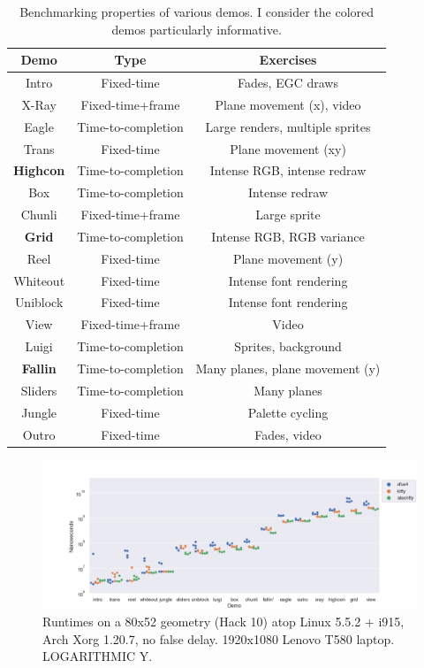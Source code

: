 \begin{table}[!htbp]
  \centering
  \begin{tabular}{ |c|c|c| }
    \hline
    Demo & Type & Exercises \\
    \hline
    \hline
    Intro & Fixed-time & Fades, EGC draws \\
    \hline
    X-Ray & Fixed-time+frame & Plane movement (x), video \\
    \hline
    Eagle & Time-to-completion & Large renders, multiple sprites \\
    \hline
    Trans & Fixed-time & Plane movement (xy) \\
    \hline
    \rowcolor{blue!25}
    \textbf{Highcon} & Time-to-completion & Intense RGB, intense redraw \\
    \hline
    Box & Time-to-completion & Intense redraw \\
    \hline
    Chunli & Fixed-time+frame & Large sprite \\
    \hline
    \rowcolor{blue!25}
    \textbf{Grid} & Time-to-completion & Intense RGB, RGB variance \\
    \hline
    Reel & Fixed-time & Plane movement (y) \\
    \hline
    Whiteout & Fixed-time & Intense font rendering \\
    \hline
    Uniblock & Fixed-time & Intense font rendering \\
    \hline
    View & Fixed-time+frame & Video \\
    \hline
    Luigi & Time-to-completion & Sprites, background \\
    \hline
    \rowcolor{blue!25}
    \textbf{Fallin} & Time-to-completion & Many planes, plane movement (y) \\
    \hline
    Sliders & Time-to-completion & Many planes \\
    \hline
    Jungle & Fixed-time & Palette cycling \\
    \hline
    Outro & Fixed-time & Fades, video \\
    \hline
  \end{tabular}
\caption[Benchmarking properties of various demos.]{Benchmarking properties of
  various demos. I consider the colored demos particularly informative.}
\label{table:benchmarks}
\end{table}


\begin{figure}
\centering
\includegraphics[width=1\textwidth]{media/i915-80x52.png}
\caption[80x52 Intel i7-8550U benchmarks.]{Runtimes on a 80x52 geometry (Hack 10) atop Linux 5.5.2 + i915, Arch Xorg 1.20.7, no false delay. 1920x1080 Lenovo T580 laptop. LOGARITHMIC Y.}
\label{fig:intel-full}
\end{figure}

